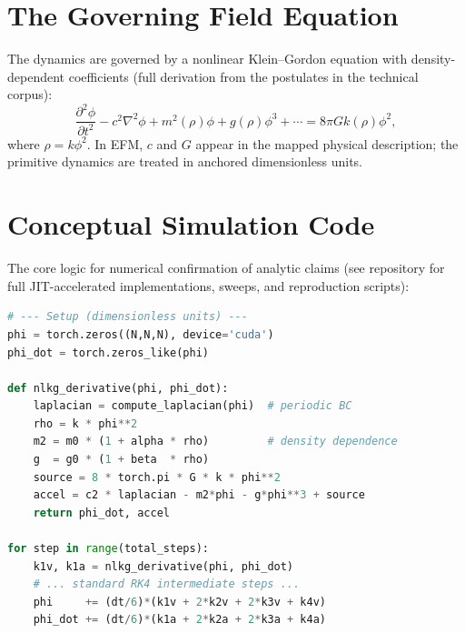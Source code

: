 \documentclass[11pt, twoside]{article}
\begin{document}
\newpage
\appendix

\section{The Governing Field Equation}
The dynamics are governed by a nonlinear Klein--Gordon equation with density-dependent coefficients (full derivation from the postulates in the technical corpus):
\[
\frac{\partial^2\phi}{\partial t^2} - c^2 \nabla^2 \phi + m^2(\rho)\phi + g(\rho)\phi^3 + \cdots = 8\pi G k(\rho)\phi^2,
\]
where $\rho = k\phi^2$. In EFM, $c$ and $G$ appear in the mapped physical description; the primitive dynamics are treated in anchored dimensionless units.

\section{Conceptual Simulation Code}
The core logic for numerical confirmation of analytic claims (see repository for full JIT-accelerated implementations, sweeps, and reproduction scripts):

\begin{lstlisting}[language=Python, caption=Conceptual NLKG Evolution (RK4) for Scalar Field]
# --- Setup (dimensionless units) ---
phi = torch.zeros((N,N,N), device='cuda')
phi_dot = torch.zeros_like(phi)

def nlkg_derivative(phi, phi_dot):
    laplacian = compute_laplacian(phi)  # periodic BC
    rho = k * phi**2
    m2 = m0 * (1 + alpha * rho)         # density dependence
    g  = g0 * (1 + beta  * rho)
    source = 8 * torch.pi * G * k * phi**2
    accel = c2 * laplacian - m2*phi - g*phi**3 + source
    return phi_dot, accel

for step in range(total_steps):
    k1v, k1a = nlkg_derivative(phi, phi_dot)
    # ... standard RK4 intermediate steps ...
    phi     += (dt/6)*(k1v + 2*k2v + 2*k3v + k4v)
    phi_dot += (dt/6)*(k1a + 2*k2a + 2*k3a + k4a)
\end{lstlisting}
\end{document}
